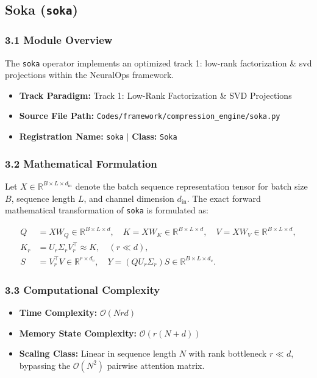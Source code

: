 \subsection{Soka (\texttt{soka})}
\label{sec:app_module_soka}

\subsubsection*{3.1 Module Overview}
The \texttt{soka} operator implements an optimized track 1: low-rank factorization \& svd projections within the NeuralOps framework.
\begin{itemize}
    \item \textbf{Track Paradigm:} Track 1: Low-Rank Factorization & SVD Projections
    \item \textbf{Source File Path:} \texttt{Codes/framework/compression\_engine/soka.py}
    \item \textbf{Registration Name:} \texttt{soka} $\mid$ \textbf{Class:} \texttt{Soka}
\end{itemize}

\subsubsection*{3.2 Mathematical Formulation}
Let $X \in \mathbb{R}^{B \times L \times d_{\text{in}}}$ denote the batch sequence representation tensor for batch size $B$, sequence length $L$, and channel dimension $d_{\text{in}}$. The exact forward mathematical transformation of \texttt{soka} is formulated as:

\begin{align}
Q &= X W_Q \in \mathbb{R}^{B \times L \times d}, \quad K = X W_K \in \mathbb{R}^{B \times L \times d}, \quad V = X W_V \in \mathbb{R}^{B \times L \times d}, \\
K_r &= U_r \Sigma_r V_r^\top \approx K, \quad (r \ll d), \\
S &= V_r^\top V \in \mathbb{R}^{r \times d_v}, \quad Y = (Q U_r \Sigma_r) S \in \mathbb{R}^{B \times L \times d_v}.
\end{align}


\subsubsection*{3.3 Computational Complexity}
\begin{itemize}
    \item \textbf{Time Complexity:} $\mathcal{O}(N r d)$
    \item \textbf{Memory State Complexity:} $\mathcal{O}(r(N + d))$
    \item \textbf{Scaling Class:} Linear in sequence length $N$ with rank bottleneck $r \ll d$, bypassing the $\mathcal{O}(N^2)$ pairwise attention matrix.
\end{itemize}

